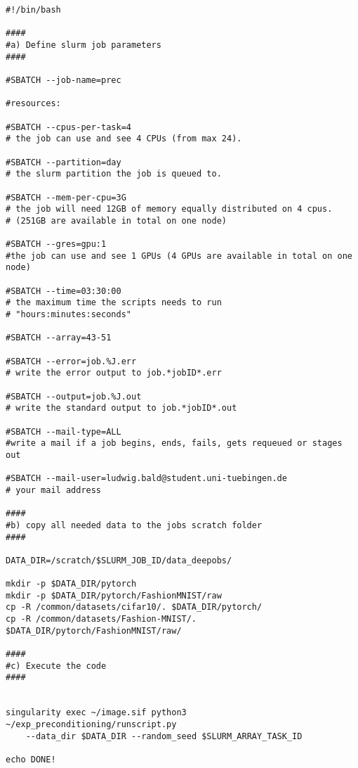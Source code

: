 \documentclass[twoside,12pt,a4paper]{report}
\begin{document}
\begin{verbatim}
#!/bin/bash

####
#a) Define slurm job parameters
####

#SBATCH --job-name=prec

#resources:

#SBATCH --cpus-per-task=4
# the job can use and see 4 CPUs (from max 24).

#SBATCH --partition=day
# the slurm partition the job is queued to.

#SBATCH --mem-per-cpu=3G
# the job will need 12GB of memory equally distributed on 4 cpus.
# (251GB are available in total on one node)

#SBATCH --gres=gpu:1
#the job can use and see 1 GPUs (4 GPUs are available in total on one node)

#SBATCH --time=03:30:00
# the maximum time the scripts needs to run
# "hours:minutes:seconds"

#SBATCH --array=43-51

#SBATCH --error=job.%J.err
# write the error output to job.*jobID*.err

#SBATCH --output=job.%J.out
# write the standard output to job.*jobID*.out

#SBATCH --mail-type=ALL
#write a mail if a job begins, ends, fails, gets requeued or stages out

#SBATCH --mail-user=ludwig.bald@student.uni-tuebingen.de
# your mail address

####
#b) copy all needed data to the jobs scratch folder
####

DATA_DIR=/scratch/$SLURM_JOB_ID/data_deepobs/

mkdir -p $DATA_DIR/pytorch
mkdir -p $DATA_DIR/pytorch/FashionMNIST/raw
cp -R /common/datasets/cifar10/. $DATA_DIR/pytorch/
cp -R /common/datasets/Fashion-MNIST/. $DATA_DIR/pytorch/FashionMNIST/raw/

####
#c) Execute the code
####


singularity exec ~/image.sif python3 ~/exp_preconditioning/runscript.py 
    --data_dir $DATA_DIR --random_seed $SLURM_ARRAY_TASK_ID

echo DONE!
\end{verbatim}




\end{document}
